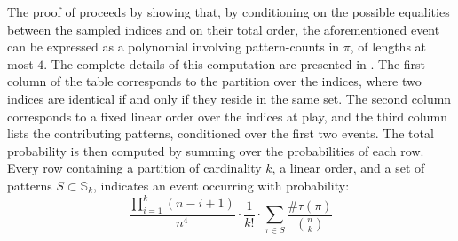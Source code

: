 \documentclass{article}
\newcommand{\pc}[2]{{\# \mathtt{ #1 } \left( #2 \right)}}
\theoremstyle{remark}
\theoremstyle{plain}
\begin{document}
\begin{appendices}
The proof of  proceeds by showing that, by conditioning on the possible equalities between the sampled indices and on their total order, the aforementioned event can be expressed as a polynomial involving pattern-counts in $\pi$, of lengths at most $4$. The complete details of this computation are presented in . The first column of the table corresponds to the partition over the indices, where two indices are identical if and only if they reside in the same set. The second column corresponds to a fixed linear order over the indices at play, and the third column lists the contributing patterns, conditioned over the first two events. The total probability is then computed by summing over the probabilities of each row. Every row containing a partition of cardinality $k$, a linear order, and a set of patterns $S \subset \mathbb{S}_k$, indicates an event occurring with probability:
\[
    \frac{\prod_{i=1}^k (n-i+1) }{n^4} \cdot \frac{1}{k!} \cdot \sum_{\tau \in S} \frac{\pc{\tau}{\pi}}{\binom{n}{k}}
\]


\end{appendices}
\end{document}

